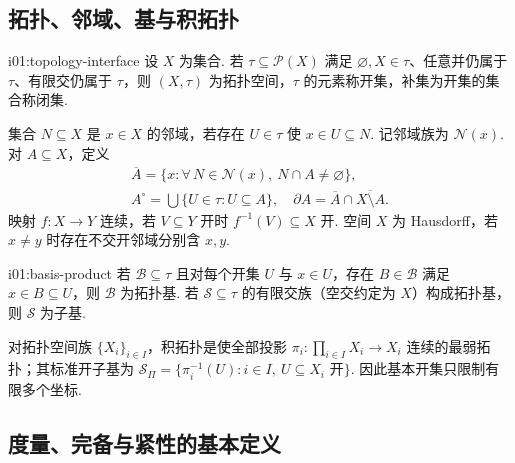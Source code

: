 \subsection{拓扑、邻域、基与积拓扑}

\begin{FADefinition}[C][拓扑最小接口]{i01:topology-interface}
设 \(\displaystyle X\) 为集合. 若 \(\displaystyle \tau\subseteq\mathcal P(X)\) 满足 \(\displaystyle \varnothing,X\in\tau\)、任意并仍属于 \(\displaystyle \tau\)、有限交仍属于 \(\displaystyle \tau\)，则 \(\displaystyle (X,\tau)\) 为拓扑空间，\(\displaystyle \tau\) 的元素称开集，补集为开集的集合称闭集.

集合 \(\displaystyle N\subseteq X\) 是 \(\displaystyle x\in X\) 的邻域，若存在 \(\displaystyle U\in\tau\) 使 \(\displaystyle x\in U\subseteq N\). 记邻域族为 \(\displaystyle \mathcal N(x)\). 对 \(\displaystyle A\subseteq X\)，定义
\[
\begin{gathered}
\overline A=\{x:\forall\,N\in\mathcal N(x),\ N\cap A\neq\varnothing\},\\
A^\circ=\bigcup\{U\in\tau:U\subseteq A\},\quad \partial A=\overline A\cap\overline{X\setminus A}.
\end{gathered}
\]
映射 \(\displaystyle f:X\to Y\) 连续，若 \(\displaystyle V\subseteq Y\) 开时 \(\displaystyle f^{-1}(V)\subseteq X\) 开. 空间 \(\displaystyle X\) 为 Hausdorff，若 \(\displaystyle x\neq y\) 时存在不交开邻域分别含 \(\displaystyle x,y\).
\end{FADefinition}

\begin{FADefinition}[C][基、子基与积拓扑]{i01:basis-product}
若 \(\displaystyle \mathcal B\subseteq\tau\) 且对每个开集 \(\displaystyle U\) 与 \(\displaystyle x\in U\)，存在 \(\displaystyle B\in\mathcal B\) 满足 \(\displaystyle x\in B\subseteq U\)，则 \(\displaystyle \mathcal B\) 为拓扑基. 若 \(\displaystyle \mathcal S\subseteq\tau\) 的有限交族（空交约定为 \(\displaystyle X\)）构成拓扑基，则 \(\displaystyle \mathcal S\) 为子基.

对拓扑空间族 \(\displaystyle \{X_i\}_{i\in I}\)，积拓扑是使全部投影 \(\displaystyle \pi_i:\prod_{i\in I}X_i\to X_i\) 连续的最弱拓扑；其标准开子基为 \(\displaystyle \mathcal S_{\Pi}=\{\pi_i^{-1}(U):i\in I,\ U\subseteq X_i\text{ 开}\}\).
因此基本开集只限制有限多个坐标.
\end{FADefinition}

\subsection{度量、完备与紧性的基本定义}

